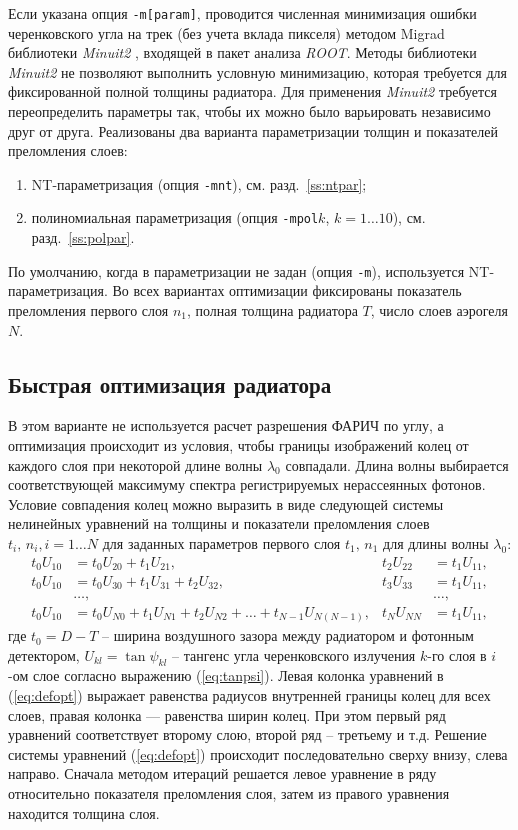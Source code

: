 \documentclass[12pt]{article}
\begin{document}
Если указана опция {\tt -m[param]}, проводится численная минимизация ошибки черенковского угла на трек (без учета вклада пикселя) 
методом Migrad библиотеки {\em Minuit2} \cite{minuit2}, входящей в пакет анализа {\em ROOT}. Методы библиотеки {\em Minuit2} не 
позволяют выполнить условную минимизацию, которая требуется для фиксированной полной толщины радиатора. 
Для применения {\em Minuit2} требуется переопределить параметры так, чтобы их можно было варьировать независимо друг от друга.
Реализованы два варианта параметризации толщин и показателей преломления слоев:
\begin{enumerate}
\item NT-параметризация (опция {\tt -mnt}), см. разд.~\ref{ss:ntpar};
\item полиномиальная параметризация (опция {\tt -mpol$k$}, $k=1\ldots 10$), см. разд.~\ref{ss:polpar}.
\end{enumerate}
По умолчанию, когда в параметризации не задан (опция {\tt -m}), используется NT-параметризация.
Во всех вариантах оптимизации фиксированы показатель преломления первого слоя $n_1$, полная толщина радиатора $T$, число слоев аэрогеля $N$.

\subsection{Быстрая оптимизация радиатора}
\label{ss:defopt}
В этом варианте не используется расчет разрешения ФАРИЧ по углу, а оптимизация происходит из условия, чтобы границы изображений колец от каждого слоя при 
некоторой длине волны $\lambda_0$ совпадали. Длина волны выбирается соответствующей максимуму спектра регистрируемых нерассеянных фотонов.
Условие совпадения колец можно выразить в виде следующей системы нелинейных уравнений на толщины и показатели преломления слоев $t_i,\,n_i, i=1\ldots N$ для заданных
параметров первого слоя $t_1,\,n_1$ для длины волны $\lambda_0$:
\begin{align}\label{eq:defopt}
t_0 U_{10} & = t_0 U_{20} + t_1 U_{21},              & t_2 U_{22} & = t_1 U_{11}, \nonumber\\
t_0 U_{10} & = t_0 U_{30} + t_1 U_{31} + t_2 U_{32}, & t_3 U_{33} & = t_1 U_{11}, \nonumber\\
& \ldots, & & \ldots, \\
t_0 U_{10} & = t_0 U_{N0} + t_1 U_{N1} + t_2 U_{N2} + \ldots + t_{N-1} U_{N(N-1)}, & t_N U_{NN} & = t_1 U_{11}, \nonumber
\end{align}
где $t_0=D-T$ -- ширина воздушного зазора между радиатором и фотонным детектором, $U_{kl} = \tan\psi_{kl}$ -- тангенс угла черенковского излучения $k$-го слоя в $i$-ом слое
согласно выражению (\ref{eq:tanpsi}). Левая колонка уравнений в (\ref{eq:defopt}) выражает равенства радиусов внутренней границы колец для всех слоев, правая колонка --- равенства
ширин колец. При этом первый ряд уравнений соответствует второму слою, второй ряд -- третьему и т.д. Решение системы уравнений (\ref{eq:defopt}) происходит последовательно 
сверху внизу, слева направо. Сначала методом итераций решается левое уравнение в ряду относительно показателя преломления слоя, затем из правого уравнения находится толщина слоя.
\end{document}

